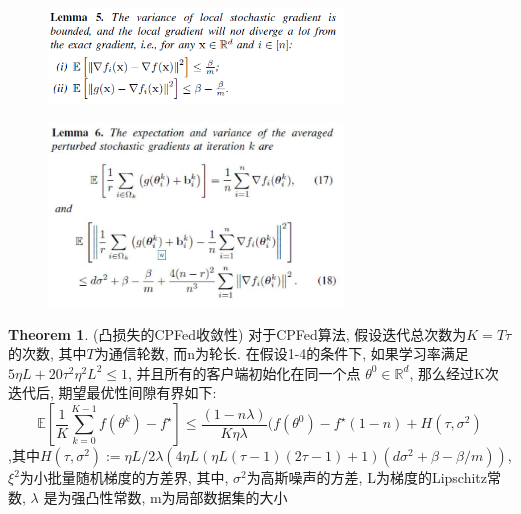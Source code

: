 \documentclass[a4paper]{article}
\theoremstyle{definition}
\newtheorem{theorem}{Theorem}[section]
\numberwithin{equation}{section}
\begin{document}
\begin{figure}[ht]
    \setlength{\abovecaptionskip}{0.1cm}
    \centering    
    \includegraphics[width=0.7\textwidth]{CPFed/Lemma5.png}
    \label{Lemma5}
\end{figure}
\begin{figure}[ht]
    \setlength{\abovecaptionskip}{0.1cm}
    \centering    
    \includegraphics[width=0.7\textwidth]{CPFed/Lemma6.jpg}
    \label{Lemma6}
\end{figure}

\begin{theorem}
(凸损失的CPFed收敛性)
对于CPFed算法, 假设迭代总次数为$K= T\tau$的次数, 其中$T$为通信轮数, 而n为轮长. 在假设1-4的条件下, 如果学习率满足$5\eta L +20 \tau ^2\eta^2 L^2 \leqslant 1$, 并且所有的客户端初始化在同一个点 $\theta ^0 \in \mathbb{R}^d$, 那么经过K次迭代后, 期望最优性间隙有界如下:
\begin{equation}
  \mathbb{E} \left[  \frac{1}{K} \sum_{k=0}^{K-1}f(\theta^k)-f^\star \right]\leqslant
  \frac{(1-n\lambda)}{K \eta \lambda}  (f(\theta^0)-f^\star (1-n)
  +H(\tau,\sigma^2)
\end{equation}
,其中$H(\tau,\sigma^2) := \eta L /2 \lambda (4 \eta L(\eta L(\tau -1)(2 \tau-1)+1) (d \sigma^2+\beta - \beta /m ))$, $\xi^2$为小批量随机梯度的方差界, 其中, $\sigma^2$为高斯噪声的方差, L为梯度的Lipschitz常数, $\lambda$ 是为强凸性常数, m为局部数据集的大小

\end{theorem}
\end{document}
